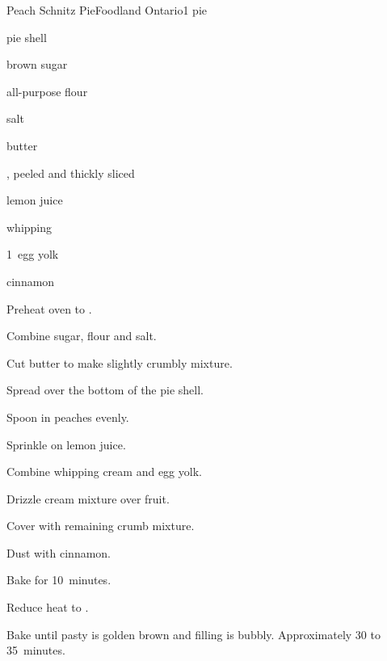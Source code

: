 \begin{recipe}{Peach Schnitz Pie}{Foodland Ontario}{1 pie}

\begin{ingredients}
\item pie shell
\item \C{\twothird} brown sugar
\item {} all-purpose flour
\item salt
\item {} butter
\item {} , peeled and thickly sliced
\item {} lemon juice
\item \C{\quarter} whipping 
\item 1~egg yolk
\item \C{\half} cinnamon
\end{ingredients}

\begin{directions}
\item Preheat oven to .
\item Combine sugar, flour and salt.
\item Cut butter to make slightly crumbly mixture.
\item Spread \third{} over the bottom of the pie shell.
\item Spoon in peaches evenly.
\item Sprinkle on lemon juice.
\item Combine whipping cream and egg yolk.
\item Drizzle cream mixture over fruit.
\item Cover with remaining crumb mixture.
\item Dust with cinnamon.
\item Bake for 10~minutes.
\item Reduce heat to .
\item Bake until pasty is golden brown and filling is bubbly. Approximately 30 to 35~minutes.
\end{directions}

\end{recipe}

